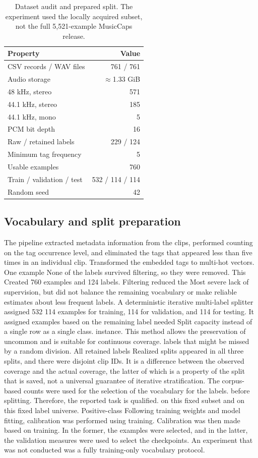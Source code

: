 \documentclass[10pt,twocolumn,letterpaper]{article}
\begin{document}
\begin{table}[t]
\centering\small
\caption{Dataset audit and prepared split. The experiment used the locally acquired subset, not the full 5,521-example MusicCaps release.}
\label{tab:data}
\begin{tabularx}{\linewidth}{@{}Xr@{}}
\toprule
Property & Value\\
\midrule
CSV records / WAV files & 761 / 761\\
Audio storage & $\approx$1.33 GiB\\
48 kHz, stereo & 571\\
44.1 kHz, stereo & 185\\
44.1 kHz, mono & 5\\
PCM bit depth & 16\\
Raw / retained labels & 229 / 124\\
Minimum tag frequency & 5\\
Usable examples & 760\\
Train / validation / test & 532 / 114 / 114\\
Random seed & 42\\
\bottomrule
\end{tabularx}
\end{table}

\subsection{Vocabulary and split preparation}
The pipeline extracted metadata information from the clips, performed counting on the tag occurrence level, and eliminated the tags that appeared less than five times in an individual clip. Transformed the embedded tags to multi-hot vectors. One example None of the labels survived filtering, so they were removed. This Created 760 examples and 124 labels. Filtering reduced the Most severe lack of supervision, but did not balance the remaining vocabulary or make reliable estimates about less frequent labels. A deterministic iterative multi-label splitter assigned 532 114 examples for training, 114 for validation, and 114 for testing. It assigned examples based on the remaining label needed Split capacity instead of a single row as a single class. instance. This method allows the preservation of uncommon and is suitable for continuous coverage. labels that might be missed by a random division. All retained labels Realized splits appeared in all three splits, and there were disjoint clip IDs. It is a difference between the observed coverage and the actual coverage, the latter of which is a property of the split that is saved, not a universal guarantee of iterative stratification. The corpus-based counts were used for the selection of the vocabulary for the labels. before splitting. Therefore, the reported task is qualified. on this fixed subset and on this fixed label universe. Positive-class Following training weights and model fitting, calibration was performed using training. Calibration was then made based on training. In the former, the examples were selected, and in the latter, the validation measures were used to select the checkpoints. An experiment that was not conducted was a fully training-only vocabulary protocol.
\end{document}

